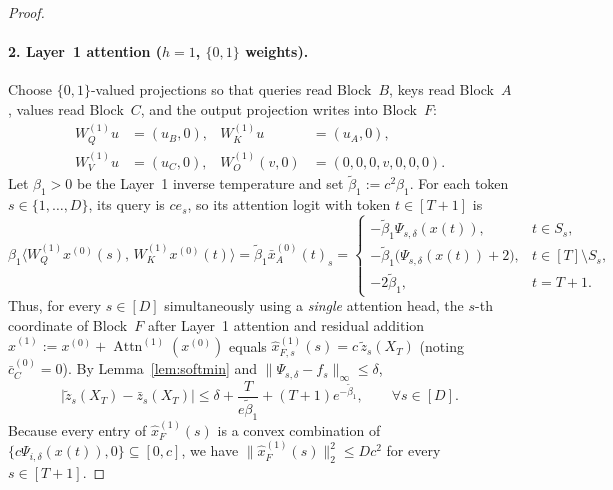 \documentclass[11pt]{article}
\theoremstyle{plain}
\theoremstyle{definition}
\theoremstyle{remark}
\DeclareMathOperator{\Attn}{Attn}
\newcommand{\1}{\mathbf{1}}
\begin{document}
\begin{proof}
\paragraph{2. Layer~1 attention ($h = 1$, $\{0,1\}$ weights).}
Choose $\{0,1\}$-valued projections so that queries read Block~$B$, keys read Block~$A$, values read Block~$C$, and the output projection writes into Block~$F$:
\begin{align*}
W_Q^{(1)} u &= (u_B, 0), & W_K^{(1)} u &= (u_A, 0), \\
W_V^{(1)} u &= (u_C, 0), & W_O^{(1)} (v, 0) &= (0,0,0,v,0,0,0).
\end{align*}
Let $\beta_1 > 0$ be the Layer~1 inverse temperature and set $\tilde{\beta}_1 := c^2 \beta_1$. For each token $s \in \{1, \dots, D\}$, its query is $c e_s$, so its attention logit with token $t \in [T+1]$ is
\[
\beta_1 \bigl\langle W_Q^{(1)} x^{(0)}(s),\, W_K^{(1)} x^{(0)}(t) \bigr\rangle
= \tilde{\beta}_1 \bar{x}^{(0)}_A(t)_s
= \begin{cases}
-\tilde{\beta}_1 \Psi_{s,\delta}(x(t)), & t \in S_s, \\
-\tilde{\beta}_1\bigl(\Psi_{s,\delta}(x(t)) + 2\bigr), & t \in [T] \setminus S_s, \\
-2\tilde{\beta}_1, & t = T + 1.
\end{cases}
\]
Thus, for every $s \in [D]$ simultaneously using a \emph{single} attention head, the $s$-th coordinate of Block~$F$ after Layer~1 attention and residual addition $\hat{x}^{(1)} := x^{(0)} + \Attn^{(1)}(x^{(0)})$ equals $\hat{x}^{(1)}_{F,s}(s) = c\,\tilde{z}_s(X_T)$ (noting $\bar{c}^{(0)}_C = 0$). By Lemma~\ref{lem:softmin} and $\|\Psi_{s,\delta} - f_s\|_\infty \le \delta$,
\begin{equation}\label{eq:thmA-L1}
\bigl|\tilde{z}_s(X_T) - \bar{z}_s(X_T)\bigr| \le \delta + \frac{T}{e\tilde{\beta}_1} + (T + 1)e^{-\tilde{\beta}_1}, \qquad \forall s \in [D].
\end{equation}
Because every entry of $\hat{x}^{(1)}_F(s)$ is a convex combination of $\{c\Psi_{i,\delta}(x(t)), 0\} \subseteq [0,c]$, we have $\|\hat{x}^{(1)}_F(s)\|_2^2 \le D c^2$ for every $s \in [T+1]$.


\end{proof}
\end{document}
